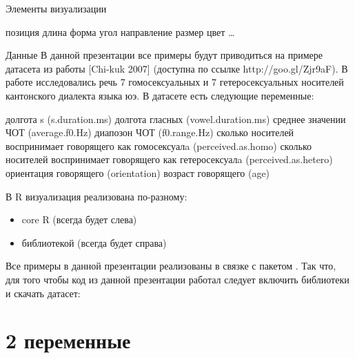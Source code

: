 \begin{frame}{Элементы визуализации}
\begin{itemize}
\mytem позиция
\mytem длина
\mytem форма
\mytem угол
\mytem направление
\mytem размер
\mytem цвет
\mytem \dots
\end{itemize}
\end{frame}
\begin{frame}{Данные}
В данной презентации все примеры будут приводиться на примере датасета из работы [Chi-kuk 2007] (доступна по ссылке http://goo.gl/Zjr9aF). В работе исследовались речь 7 гомосексуальных и 7 гетеросексуальных носителей кантонского диалекта языка юэ. В датасете есть следующие переменные:
\begin{itemize}
\mytem долгота s (s.duration.ms)
\mytem долгота гласных (vowel.duration.ms)
\mytem среднее значении ЧОТ (average.f0.Hz)
\mytem диапозон ЧОТ (f0.range.Hz)
\mytem сколько носителей воспринимает говорящего как гомосексуалa (perceived.as.homo)
\mytem сколько носителей воспринимает говорящего как гетеросексуалa (perceived.as.hetero)
\mytem ориентация говорящего (orientation)
\mytem возраст говорящего (age)
\end{itemize}
\end{frame}
\begin{frame}
В R визуализация реализована по-разному:
\begin{itemize}
\item core R (всегда будет слева)
\item библиотекой  (всегда будет справа)
\end{itemize}
Все примеры  в данной презентации реализованы в связке с пакетом . Так что, для того чтобы код из данной презентации работал следует включить библиотеки и скачать датасет:
\end{frame}
\section{2 переменные}
